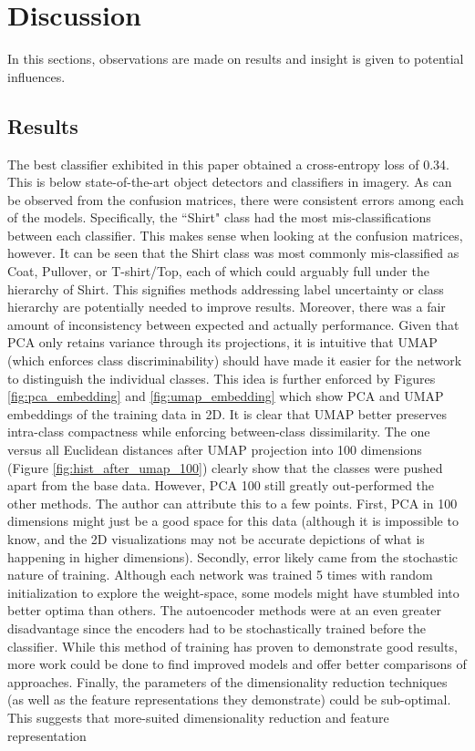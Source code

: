 \documentclass[conference]{IEEEtran}
\begin{document}

\section{Discussion} \label{Discussion}
In this sections, observations are made on results and insight is given to potential influences.

\subsection{Results}
The best classifier exhibited in this paper obtained a cross-entropy loss of 0.34.  This is below state-of-the-art object detectors and classifiers in imagery.  As can be observed from the confusion matrices, there were consistent errors among each of the models.  Specifically, the ``Shirt" class had the most mis-classifications between each classifier.  This makes sense when looking at the confusion matrices, however.  It can be seen that the Shirt class was most commonly mis-classified as Coat, Pullover, or T-shirt/Top, each of which could arguably full under the hierarchy of Shirt.  This signifies methods addressing label uncertainty or class hierarchy are potentially needed to improve results.  Moreover, there was a fair amount of inconsistency between expected and actually performance.  Given that PCA only retains variance through its projections, it is intuitive that UMAP (which enforces class discriminability) should have made it easier for the network to distinguish the individual classes.  This idea is further enforced by Figures \ref{fig:pca_embedding} and \ref{fig:umap_embedding} which show PCA and UMAP embeddings of the training data in 2D.  It is clear that UMAP better preserves intra-class compactness while enforcing between-class dissimilarity.  The one versus all Euclidean distances after UMAP projection into 100 dimensions (Figure \ref{fig:hist_after_umap_100}) clearly show that the classes were pushed apart from the base data.  However, PCA 100 still greatly out-performed the other methods.  The author can attribute this to a few points.  First, PCA in 100 dimensions might just be a good space for this data (although it is impossible to know, and the 2D visualizations may not be accurate depictions of what is happening in higher dimensions).  Secondly, error likely came from the stochastic nature of training.  Although each network was trained 5 times with random initialization to explore the weight-space, some models might have stumbled into better optima than others.  The autoencoder methods were at an even greater disadvantage since the encoders had to be stochastically trained before the classifier.  While this method of training has proven to demonstrate good results, more work could be done to find improved models and offer better comparisons of approaches. Finally, the parameters of the dimensionality reduction techniques (as well as the feature representations they demonstrate) could be sub-optimal.  This suggests that more-suited dimensionality reduction and feature representation 
\end{document}
